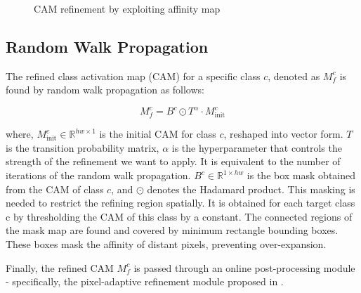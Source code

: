 \begin{figure}[tbp]
    \centering
    \caption{CAM refinement by exploiting affinity map}
    \label{fig:refinement}
\end{figure}

\subsection{Random Walk Propagation}
\label{subsec:random_walk}

The refined class activation map (CAM) for a specific class $c$, denoted as $M^c_f$ is found by random walk propagation as follows:

\begin{equation}
    M_f^c = B^c \odot T^\alpha \cdot M_{\text{init}}^c
\end{equation}

where, $M^c_{\text{init}} \in \mathbb{R}^{hw \times 1}$ is the initial CAM for class $c$, reshaped into vector form. $T$ is the transition probability matrix, $\alpha$ is the hyperparameter that controls the strength of the refinement we want to apply. It is equivalent to the number of iterations of the random walk propagation. \( B^c \in \mathbb{R}^{1 \times hw} \) is the box mask obtained from the CAM of class \( c \), and \( \odot \) denotes the Hadamard product. This masking is needed to restrict the refining region spatially. It is obtained for each target class c by thresholding the CAM of this class by a constant. The connected regions of the mask map are found and covered by minimum rectangle bounding boxes. These boxes mask the affinity of distant pixels, preventing over-expansion.

Finally, the refined CAM $M^c_f$ is passed through an online post-processing module - specifically, the pixel-adaptive refinement module proposed in \cite{wsss_afa_affinity_from_attention}.

